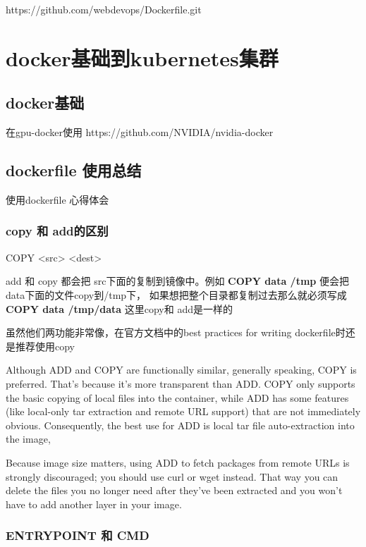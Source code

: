 https://github.com/webdevops/Dockerfile.git
\chapter{docker基础到kubernetes集群}

\section{docker基础}

在gpu-docker使用
https://github.com/NVIDIA/nvidia-docker

\section{dockerfile 使用总结}

使用dockerfile 心得体会

\subsection{copy 和 add的区别}

COPY <src> <dest>

add 和 copy 都会把 src下面的复制到镜像中。例如 \textbf{COPY data /tmp } 便会把data下面的文件copy到/tmp下，
如果想把整个目录都复制过去那么就必须写成\textbf{COPY data /tmp/data } 这里copy和 add是一样的

虽然他们两功能非常像，在官方文档中的best practices for writing dockerfile时还是推荐使用copy

Although ADD and COPY are functionally similar, generally speaking, COPY is preferred. That’s because it’s more transparent than ADD. COPY only supports the basic copying of local files into the container, while ADD has some features (like local-only tar extraction and remote URL support) that are not immediately obvious. Consequently, the best use for ADD is local tar file auto-extraction into the image,

Because image size matters, using ADD to fetch packages from remote URLs is strongly discouraged; you should use curl or wget instead. That way you can delete the files you no longer need after they’ve been extracted and you won’t have to add another layer in your image.



\subsection{ENTRYPOINT 和 CMD}

